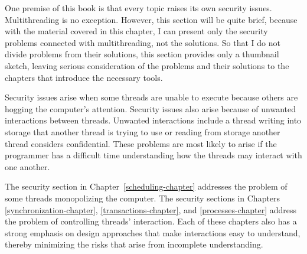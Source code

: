One premise of this book is that every topic raises its own security
issues.  Multithreading is no exception.  However, this section will
be quite brief, because with the material covered in this chapter, I can present only the
security problems connected with multithreading, not the
solutions.  So that I do not divide problems from their solutions, this
section provides only a thumbnail sketch, leaving serious
consideration of the problems and their solutions to the chapters that
introduce the necessary tools.

Security issues arise
when some threads are unable to execute because others are hogging the
computer's attention.  Security issues also arise because of unwanted
interactions between threads. Unwanted interactions include a thread writing into storage
that another thread is trying to use or reading from storage another
thread considers confidential.  These problems are most
likely to arise if the programmer has a difficult time understanding
how the threads may interact with one another.

The security section in Chapter~\ref{scheduling-chapter} addresses the
problem of some threads monopolizing the computer.  The security
sections in Chapters \ref{synchronization-chapter},
\ref{transactions-chapter}, and \ref{processes-chapter} address the
problem of controlling threads' interaction.  Each of these chapters
also has a strong emphasis on design approaches that make interactions
easy to understand, thereby minimizing the risks that arise from
incomplete understanding.

